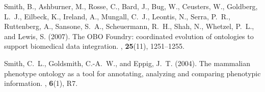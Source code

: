 \documentclass{bioinfo}
\begin{document}
\begin{thebibliography}{}
Smith, B., Ashburner, M., Rosse, C., Bard, J., Bug, W., Ceusters, W., Goldberg,
  L.~J., Eilbeck, K., Ireland, A., Mungall, C.~J., Leontis, N., Serra, P.~R.,
  Ruttenberg, A., Sansone, S.~A., Scheuermann, R.~H., Shah, N., Whetzel, P.~L.,
  and Lewis, S. (2007).
\newblock The {OBO} {F}oundry: coordinated evolution of ontologies to support
  biomedical data integration.
, {\bf 25}(11), 1251--1255.

Smith, C.~L., Goldsmith, C.-A.~W., and Eppig, J.~T. (2004).
\newblock The mammalian phenotype ontology as a tool for annotating, analyzing
  and comparing phenotypic information.
, {\bf 6}(1), R7.

\end{thebibliography}

%
\end{document}
